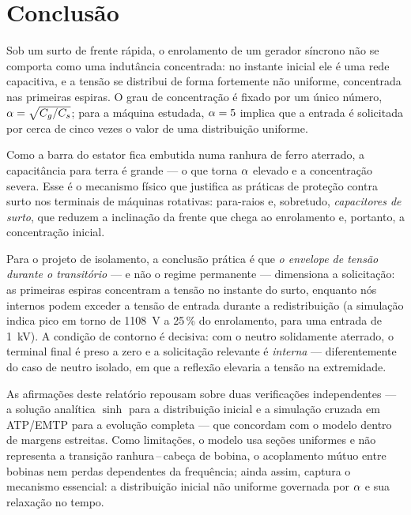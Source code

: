 \section{Conclusão}
\label{sec:conclusao}

Sob um surto de frente rápida, o enrolamento de um gerador síncrono não se comporta como uma indutância
concentrada: no instante inicial ele é uma rede capacitiva, e a tensão se distribui de forma
fortemente não uniforme, concentrada nas primeiras espiras. O grau de concentração é fixado por um
único número, \(\alpha = \sqrt{C_g/C_s}\); para a máquina estudada, \(\alpha = 5\) implica que a
entrada é solicitada por cerca de cinco vezes o valor de uma distribuição uniforme.

Como a barra do estator fica embutida numa ranhura de ferro aterrado, a capacitância para terra \Cg{} é
grande — o que torna \(\alpha\) elevado e a concentração severa. Esse é o mecanismo físico que justifica
as práticas de proteção contra surto nos terminais de máquinas rotativas: para-raios e, sobretudo,
\emph{capacitores de surto}, que reduzem a inclinação da frente que chega ao enrolamento e, portanto, a
concentração inicial.

Para o projeto de isolamento, a conclusão prática é que \emph{o envelope de tensão durante o
transitório} — e não o regime permanente — dimensiona a solicitação: as primeiras espiras concentram a
tensão no instante do surto, enquanto nós internos podem exceder a tensão de entrada durante a
redistribuição (a simulação indica pico em torno de \SI{1108}{V} a 25\,\% do enrolamento, para uma
entrada de \SI{1}{kV}). A condição de contorno é decisiva: com o neutro solidamente aterrado, o terminal
final é preso a zero e a solicitação relevante é \emph{interna} — diferentemente do caso de neutro
isolado, em que a reflexão elevaria a tensão na extremidade.

As afirmações deste relatório repousam sobre duas verificações independentes — a solução analítica
\(\sinh\) para a distribuição inicial e a simulação cruzada em ATP/EMTP para a evolução completa — que
concordam com o modelo dentro de margens estreitas. Como limitações, o modelo usa \Nsec{} seções
uniformes e não representa a transição ranhura\,–\,cabeça de bobina, o acoplamento mútuo entre bobinas
nem perdas dependentes da frequência; ainda assim, captura o mecanismo essencial: a distribuição inicial
não uniforme governada por \(\alpha\) e sua relaxação no tempo.
